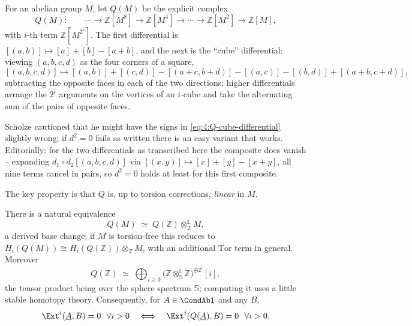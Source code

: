 \begin{definition}
\label{def:4:cubical}
For an abelian group $M$, let $Q(M)$ be the explicit complex
\begin{equation*}
Q(M):\qquad
\cdots\to\mathbb{Z}[M^{8}]\to\mathbb{Z}[M^{4}]\to\cdots\to
\mathbb{Z}[M^{2}]\to\mathbb{Z}[M],
\end{equation*}
with $i$-th term $\mathbb{Z}[M^{2^{i}}]$. The first differential is
$[(a,b)]\mapsto[a]+[b]-[a+b]$, and the next is the ``cube'' differential: viewing
$(a,b,c,d)$ as the four corners of a square,
\begin{equation}
\label{eq:4:Q-cube-differential}
[(a,b,c,d)]\longmapsto
[(a,b)]+[(c,d)]-[(a+c,b+d)]-[(a,c)]-[(b,d)]+[(a+b,c+d)],
\end{equation}
subtracting the opposite faces in each of the two directions; higher differentials
arrange the $2^{i}$ arguments on the vertices of an $i$-cube and take the
alternating sum of the pairs of opposite faces.
\end{definition}

\begin{remark}
\label{rmk:4:cube-signs}
Scholze cautioned that he might have the signs in
\eqref{eq:4:Q-cube-differential} slightly wrong; if $d^{2}=0$ fails as written
there is an easy variant that works. Editorially: for the two differentials as
transcribed here the composite does vanish -- expanding
$d_1\circ d_2[(a,b,c,d)]$ via $[(x,y)]\mapsto[x]+[y]-[x+y]$, all nine terms
cancel in pairs, so $d^2=0$ holds at least for this first composite.
\end{remark}

The key property is that $Q$ is, up to torsion corrections, \emph{linear} in
$M$.

\begin{theorem}
\label{thm:4:cubical-linearity}
There is a natural equivalence
\begin{equation*}
Q(M)\;\simeq\;Q(\mathbb{Z})\otimes^{\mathbb{L}}_{\mathbb{Z}}M,
\end{equation*}
a derived base change; if $M$ is torsion-free this reduces to
$H_{i}(Q(M))\cong H_{i}(Q(\mathbb{Z}))\otimes_{\mathbb{Z}}M$, with an additional
$\mathrm{Tor}$ term in general. Moreover
\begin{equation*}
Q(\mathbb{Z})\;\simeq\;\bigoplus_{i\geq0}\bigl(\mathbb{Z}\otimes^{\mathbb{L}}_{\mathbb{S}}
\mathbb{Z}\bigr)^{\oplus 2^{i}}[i],
\end{equation*}
the tensor product being over the sphere spectrum $\mathbb{S}$; computing it uses
a little stable homotopy theory. Consequently, for $A\in\CondAbl$ and any $B$,
\begin{equation*}
\Ext^{i}(\underline{A},B)=0\ \ \forall i>0
\quad\Longleftrightarrow\quad
\Ext^{i}(Q(\underline{A}),B)=0\ \ \forall i>0.
\end{equation*}
\end{theorem}

